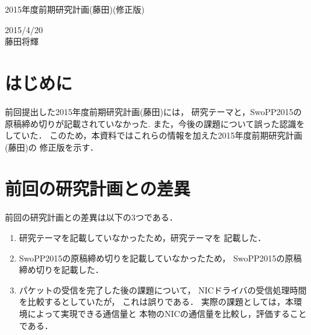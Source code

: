 \documentclass[12pt]{jsarticle}
\begin{document}

\begin{center}
{\LARGE 2015年度前期研究計画(藤田)(修正版)}
\end{center}

\begin{flushright}
  2015/4/20\\
  藤田将輝
\end{flushright}
\section{はじめに}
前回提出した2015年度前期研究計画(藤田)には，
研究テーマと，SwoPP2015の原稿締め切りが記載されていなかった.
また，今後の課題について誤った認識をしていた．
このため，本資料ではこれらの情報を加えた2015年度前期研究計画(藤田)の
修正版を示す．
\section{前回の研究計画との差異}
前回の研究計画との差異は以下の3つである．
\begin{enumerate}
    \item 研究テーマを記載していなかったため，研究テーマを
        記載した．
    \item SwoPP2015の原稿締め切りを記載していなかったため，
        SwoPP2015の原稿締め切りを記載した．
    \item パケットの受信を完了した後の課題について，
        NICドライバの受信処理時間を比較するとしていたが，
        これは誤りである．
        実際の課題としては，本環境によって実現できる通信量と
        本物のNICの通信量を比較し，評価することである．
\end{enumerate}
\end{document}

